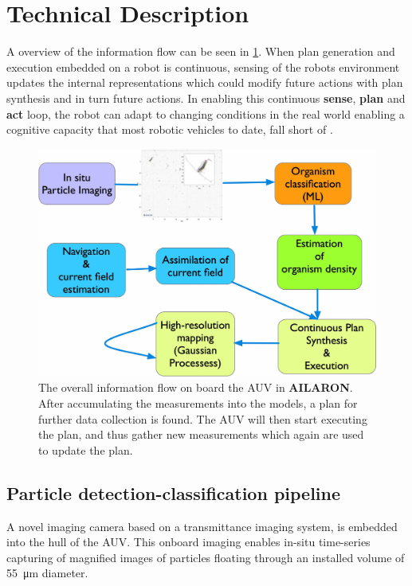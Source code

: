 \documentclass[conference]{IEEEtran}
\def\proje{{\textbf{AILARON}}}
\begin{document}
\section{Technical Description}

A overview of the information flow can be seen in
\cref{fig:sensePlanActLoop}. When plan generation and execution embedded on a robot is continuous, sensing of the robots environment
updates the internal representations which could modify future actions
with plan synthesis and in turn future actions.  In enabling this
continuous \textbf{sense}, \textbf{plan} and \textbf{act} loop, the
robot can adapt to changing conditions in the real world enabling a
cognitive capacity that most robotic vehicles to date, fall short of
\cite{rajan12}.

\begin{figure}[tbp]
\centerline{\includegraphics[width=0.8\linewidth]{figures/workflow-simplified.jpg}}
\caption{The overall information flow on board the AUV in \proje. After accumulating the measurements into the models, a plan for further data collection is found. The AUV will then start executing the plan, and thus gather new measurements which again are used to update the plan.}
\label{fig:sensePlanActLoop}
\end{figure}

\subsection{Particle detection-classification pipeline}

A novel imaging camera \cite{Davies2017a} based on a transmittance
imaging system, is embedded into the hull of the AUV. This onboard
imaging enables in-situ time-series capturing of magnified images of
particles floating through an installed volume of \SI{55}{\micro\meter}
diameter.
\end{document}

